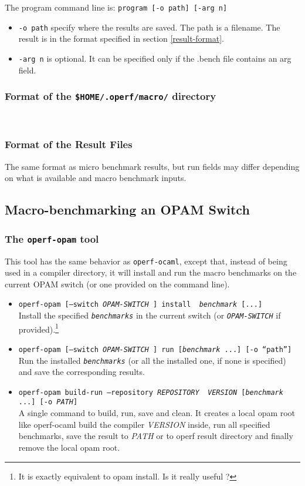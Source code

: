 \documentclass[11pt,a4paper]{article}
\begin{document}
The program command line is:
{\tt program [-o path] [-arg n]}
\begin{itemize}
\item {\tt -o path} specify where the results are saved. The path is a
  filename. The result is in the format specified in section
  \ref{result-format}.
\item {\tt -arg n} is optional. It can be specified only if the
  .bench file contains an arg field.
\end{itemize}

\subsubsection{Format of the {\tt \$HOME/.operf/macro/} directory}
~\vspace{4cm}~

\subsubsection{Format of the Result Files}

The same format as micro benchmark results, but run fields may differ
depending on what is available and macro benchmark inputs.
~\vspace{4cm}~

\subsection{Macro-benchmarking an OPAM Switch}

\subsubsection{The {\tt operf-opam} tool}

This tool has the same behavior as {\tt operf-ocaml}, except that,
instead of being used in a compiler directory, it will install and run
the macro benchmarks on the current OPAM switch (or one provided on
the command line).

\begin{itemize}
\item {\tt operf-opam [--switch {\em OPAM-SWITCH} ] install {\em
    benchmark} [...]}\\ Install the specified {\tt\em benchmarks} in
  the current switch (or {\tt\em OPAM-SWITCH} if
  provided).\footnote{It is exactly equivalent to opam install. Is it really useful ?}
\item {\tt operf-opam [--switch {\em OPAM-SWITCH} ] run [{\em benchmark} ...] [-o ``path'']}\\
  Run the installed {\tt\em benchmarks} (or all the installed one, if none
  is specified) and save the corresponding results.
\item {\tt operf-opam build-run --repository {\em REPOSITORY} {\em
    VERSION} [{\em benchmark} ...] [-o {\em PATH}]}\\ A single command
  to build, run, save and clean.  It creates a local opam root like
  operf-ocaml build the compiler {\em VERSION} inside, run all
  specified benchmarks, save the result to {\em PATH} or to operf
  result directory and finally remove the local opam root.
\end{itemize}
\end{document}
